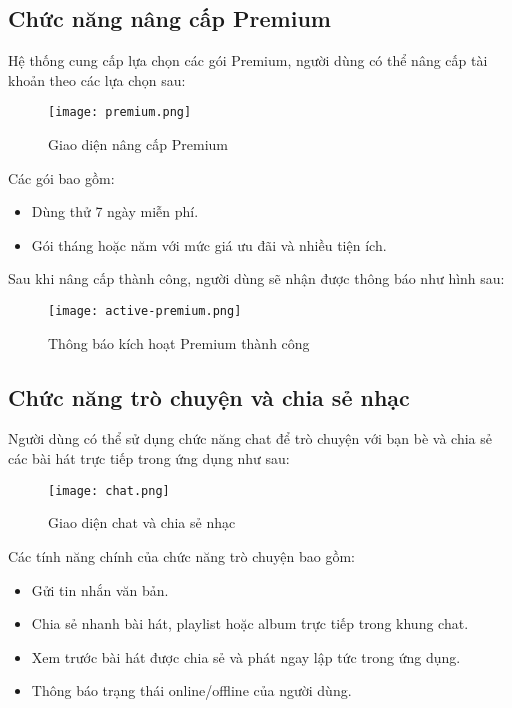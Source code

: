 \documentclass[a4paper]{article}
\begin{document}
\subsection{Chức năng nâng cấp Premium}

Hệ thống cung cấp lựa chọn các gói Premium, người dùng có thể nâng cấp tài khoản theo các lựa chọn sau:

\begin{figure}[!htb]
    \centering
    \texttt{[image: premium.png]}
    \caption{Giao diện nâng cấp Premium}
    \label{fig:premium}
\end{figure}

Các gói bao gồm:
\begin{itemize}
    \item Dùng thử 7 ngày miễn phí.
    \item Gói tháng hoặc năm với mức giá ưu đãi và nhiều tiện ích.
\end{itemize}

Sau khi nâng cấp thành công, người dùng sẽ nhận được thông báo như hình sau:

\begin{figure}[!htb]
    \centering
    \texttt{[image: active-premium.png]}
    \caption{Thông báo kích hoạt Premium thành công}
    \label{fig:active-premium}
\end{figure}

\subsection{Chức năng trò chuyện và chia sẻ nhạc}

Người dùng có thể sử dụng chức năng chat để trò chuyện với bạn bè và chia sẻ các bài hát trực tiếp trong ứng dụng như sau:

\begin{figure}[!htb]
    \centering
    \texttt{[image: chat.png]}
    \caption{Giao diện chat và chia sẻ nhạc}
    \label{fig:chat}
\end{figure}

Các tính năng chính của chức năng trò chuyện bao gồm:
\begin{itemize}
    \item Gửi tin nhắn văn bản.
    \item Chia sẻ nhanh bài hát, playlist hoặc album trực tiếp trong khung chat.
    \item Xem trước bài hát được chia sẻ và phát ngay lập tức trong ứng dụng.
    \item Thông báo trạng thái online/offline của người dùng.
\end{itemize}
\end{document}
